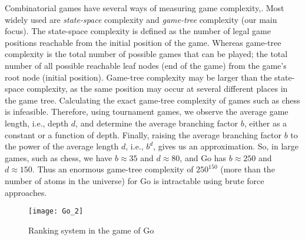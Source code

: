 Combinatorial games have several ways of measuring game complexity,\cite{b3,b16}. Most widely used are \textit{state-space} complexity and \textit{game-tree} complexity (our main focus). The state-space complexity is defined as the number of legal game positions reachable from the initial position of the game. Whereas game-tree complexity is the total number of possible games that can be played; the total number of all possible reachable leaf nodes (end of the game) from the game's root node (initial position). Game-tree complexity may be larger than the state-space complexity, as the same position may occur at several different places in the game tree. Calculating the exact game-tree complexity of games such as chess is infeasible. Therefore, using tournament games, we observe the average game length, i.e., depth $d$, and determine the average branching factor $b$, either as a constant or a function of depth. Finally, raising the average branching factor $b$ to the power of the average length $d$, i.e., $b^d$, gives us an approximation. So, in large games, such as chess, we have $b \approx 35$ and $d \approx 80$, and Go has $b \approx 250$ and $d \approx 150$\cite{b4}. Thus an enormous game-tree complexity of $250^{150}$ (more than the number of atoms in the universe) for Go is intractable using brute force approaches.

\begin{figure}[t]
    \centering
    \texttt{[image: Go\_2]}
    \caption{Ranking system in the game of Go\cite{b11}}
    \label{Go_ranking}
\end{figure}
